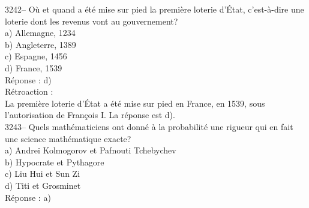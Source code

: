 \documentclass[letterpaper, 12pt]{article}
\begin{document}
3242-- O\`u et quand a \'et\'e mise sur pied la premi\`ere loterie d'\'Etat, c'est-\`a-dire une loterie dont les revenus vont au gouvernement?\\

a) Allemagne, 1234\\
b) Angleterre, 1389\\
c) Espagne, 1456\\
d) France, 1539\\

R\'eponse : d)\\

R\'etroaction :\\
La premi\`ere loterie d'\'Etat a \'et\'e mise sur pied en France, en 1539, sous l'autorisation de Fran\c cois I\ier{}. La r\'eponse est d).\\



3243-- Quels math\'ematiciens ont donn\'e \`a la probabilit\'e une rigueur qui en fait une science math\'ematique exacte?\\

a) Andre\"i Kolmogorov et Pafnouti Tchebychev\\
b) Hypocrate et Pythagore\\
c) Liu Hui et Sun Zi\\
d) Titi et Grosminet\\

R\'eponse : a)\\
\end{document}
